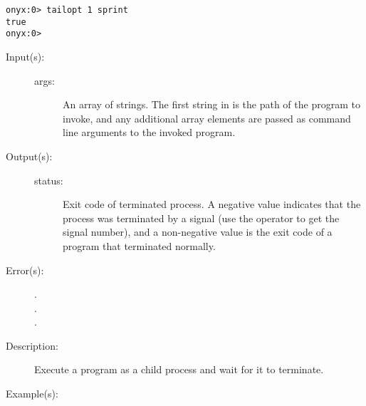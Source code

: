 \begin{description}
\begin{description}
\begin{verbatim}
onyx:0> tailopt 1 sprint
true
onyx:0>
		\end{verbatim}
	\end{description}
\label{systemdict:system}
\item[{\onyxop{args}{system}{status}}: ]
	\begin{description}\item[]
	\item[Input(s): ]
		\begin{description}\item[]
		\item[args: ]
			An array of strings.  The first string in 
			is the path of the program to invoke, and any additional
			array elements are passed as command line arguments to
			the invoked program.
		\end{description}
	\item[Output(s): ]
		\begin{description}\item[]
		\item[status: ]
			Exit code of terminated process.  A negative value
			indicates that the process was terminated by a signal
			(use the 
			operator to get the signal number), and a non-negative
			value is the exit code of a program that terminated
			normally.
		\end{description}
	\item[Error(s): ]
		\begin{description}\item[]
		\item[.]
		\item[.]
		\item[.]
		\end{description}
	\item[Description: ]
		Execute a program as a child process and wait for it to
		terminate.
	\item[Example(s): ]\begin{verbatim}


\end{verbatim}
\end{description}
\end{description}

